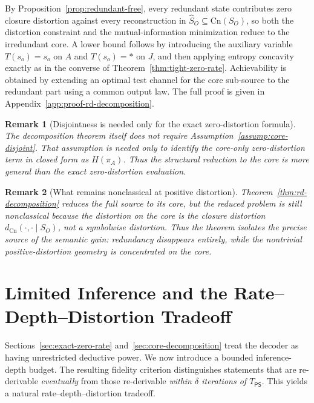 \documentclass[journal,onecolumn]{IEEEtran}
\makeatletter
\newcommand{\Cn}{\text{Cn}}
\newtheorem{remark}{Remark}[section]
\numberwithin{equation}{section}
\renewenvironment{proof}[1][\proofname]{\par
  \pushQED{\qed}%
  \normalfont \topsep6\p@\@plus6\p@\relax
  \trivlist
  \item[\hskip\labelsep
        \itshape
    #1\@addpunct{.}]\ignorespaces
}{%
  \popQED\endtrivlist\@endpefalse
}
\makeatother
\begin{document}
\begin{proof}[Proof sketch]
By Proposition~\ref{prop:redundant-free}, every redundant state contributes
zero closure distortion against every reconstruction in
\(\hat S_O\subseteq\Cn(S_O)\), so both the distortion constraint and the
mutual-information minimization reduce to the irredundant core.
A lower bound follows by introducing the auxiliary variable
\(T(s_o)=s_o\) on \(A\) and \(T(s_o)=*\) on \(J\), and then applying
entropy concavity exactly as in the converse of
Theorem~\ref{thm:tight-zero-rate}.
Achievability is obtained by extending an optimal test channel for the
core sub-source to the redundant part using a common output law.
The full proof is given in Appendix~\ref{app:proof-rd-decomposition}.
\end{proof}

\begin{remark}[Disjointness is needed only for the exact
zero-distortion formula]
\label{rem:rd-decomp-vs-disjoint}
The decomposition theorem itself does \emph{not} require
Assumption~\ref{assump:core-disjoint}.
That assumption is needed only to identify the
core-only zero-distortion term in closed form as
\(H(\pi_A)\).
Thus the structural reduction to the core is more general than
the exact zero-distortion evaluation.
\end{remark}

\begin{remark}[What remains nonclassical at positive distortion]
\label{rem:positive-D-nonclassical}
Theorem~\ref{thm:rd-decomposition} reduces the full source to its
core, but the reduced problem is still nonclassical because the
distortion on the core is the closure distortion
\(d_{\Cn}(\cdot,\cdot\mid S_O)\), not a symbolwise distortion.
Thus the theorem isolates the precise source of the semantic
gain: redundancy disappears entirely, while the nontrivial
positive-distortion geometry is concentrated on the core.
\end{remark}

\section{Limited Inference and the Rate--Depth--Distortion Tradeoff}
\label{sec:limited-inference}

Sections~\ref{sec:exact-zero-rate} and~\ref{sec:core-decomposition}
treat the decoder as having unrestricted deductive power.
We now introduce a bounded inference-depth budget.
The resulting fidelity criterion distinguishes statements that are
re-derivable \emph{eventually} from those re-derivable
\emph{within \(\delta\) iterations of \(T_{\mathsf{PS}}\)}.
This yields a natural rate--depth--distortion tradeoff.
\end{document}
